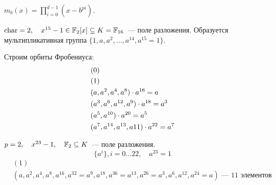 \begin{proposition}
  $m_b(x) = \prod_{i = 0}^{d - 1}(x - b^{pi})$.
\end{proposition}


\begin{example}
  $\operatorname{char} = 2, \quad x^{15} - 1 \in \mathbb{F}_2[x] \subseteq K = \mathbb{F}_{16}$~--- поле разложения.
  Образуется мультипликативная группа $\{1, a, a^2, \dots, a^{14}, a^{15} = 1 \}$.
  
  Строим орбиты Фробениуса:
  \begin{align}
    &(0) \\
    &(1) \\
    &(a, a^2, a^4, a^8) \cdot a^{16} = a \\
    &(a^3, a^6, a^{12}, a^9) \cdot a^{18} = a^3 \\
    &(a^5, a^{10}) \cdot a^{20} = a^5 \\
    &(a^7, a^{14}, a^{13}, a{11}) \cdot a^{22} = a^7
  \end{align}
\end{example}

\begin{example}
  $p = 2, \quad x^{23} - 1, \quad \mathbb{F}_2 \subseteq K$~--- поле разложения.
  \[\{ a^i \}, i = \overline{0 \dots 22}, \quad a^{23} = 1\]
  \begin{align}
    &(1) \\
    &(a, a^2, a^4, a^8, a^{16}, a^{32}=a^9, a^{18}, a^{36} = a^{13}, a^{26} = a^3, a^6, a^{12}, a^{24} = a) \text{~--- 11 элементов}
  \end{align}
\end{example}